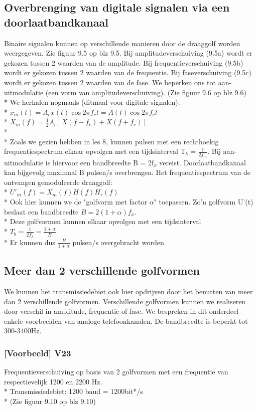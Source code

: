 \documentclass[10pt]{article}
\begin{document}
\subsection{Overbrenging van digitale signalen via een doorlaatbandkanaal}
Binaire signalen kunnen op verschillende manieren door de draaggolf worden weergegeven. Zie figuur 9.5 op blz 9.5. Bij amplitudeverschuiving (9.5a) wordt er gekozen tussen 2 waarden van de amplitude. Bij frequentieverschuiving (9.5b) wordt er gekozen tussen 2 waarden van de frequentie. Bij faseverschuiving (9.5c) wordt er gekozen tussen 2 waarden van de fase. We beperken ons tot aan-uitmodulatie (een vorm van amplitudeverschuiving). {\scriptsize (Zie figuur 9.6 op blz 9.6)}\\*
We herhalen nogmaals (ditmaal voor digitale signalen):\\*
$x_m(t) = A_cx(t)\cos{2\pi f_ct} = A(t)\cos{2\pi f_ct}$\\*
$X_m(f) = \frac{1}{2}A_c\left[X(f-f_c) + X(f+f_c)\right]$\\*\\*
Zoals we gezien hebben in les 8, kunnen pulsen met een rechthoekig frequentiespectrum elkaar opvolgen met een tijdsinterval T$_b$ = $\frac{1}{2f_m}$. Bij aan-uitmodulatie is hiervoor een bandbreedte B = 2f$_x$ vereist. Doorlaatbandkanaal kan bijgevolg maximaal B pulsen/s overbrengen. Het frequentiespectrum van de ontvangen gemoduleerde draaggolf:\\*
$U'_m(f) = X_m(f)H(f)H_r(f)$\\*
Ook hier kunnen we de "golfvorm met factor $\alpha$" toepassen. Zo'n golfvorm U'(t) beslaat een bandbreedte $B = 2(1+\alpha)f_x$.\\*
Deze golfvormen kunnen elkaar opvolgen met een tijdsinterval\\*
$T_b = \frac{1}{2f_x} = \frac{1+\alpha}{B}$\\*
Er kunnen dus $\frac{B}{1+\alpha}$ pulsen/s overgebracht worden.
\subsection{Meer dan 2 verschillende golfvormen}
We kunnen het transmissiedebiet ook hier opdrijven door het benutten van meer dan 2 verschillende golfvormen. Verschillende golfvormen kunnen we realiseren door verschil in amplitude, frequentie of fase. We bespreken in dit onderdeel enkele voorbeelden van analoge telefoonkanalen. De bandbreedte is beperkt tot 300-3400Hz.
\subsubsection{[Voorbeeld] V23}
Frequentieverschuiving op basis van 2 golfvormen met een frequentie van respectievelijk 1200 en 2200 Hz.\\*
Transmissiedebiet: 1200 baud = 1200bit*/s\\*
{\scriptsize (Zie figuur 9.10 op blz 9.10)}
\end{document}

